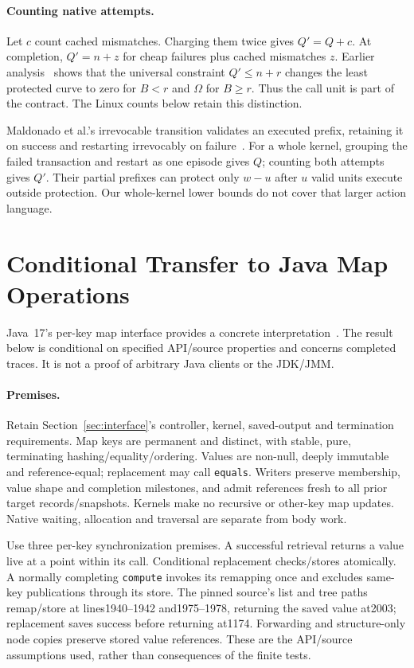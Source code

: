 \documentclass[acmsmall,screen,review,anonymous]{acmart}
\begin{document}
\paragraph{Counting native attempts.}
\label{sec:recount}
Let $c$ count cached mismatches. Charging them twice gives $Q'=Q+c$. At completion, $Q'=n+z$ for cheap failures plus cached mismatches $z$. Earlier analysis~\cite{chargedartifact} shows that the universal constraint $Q'\le n+r$ changes the least protected curve to zero for $B<r$ and $\Omega$ for $B\ge r$. Thus the call unit is part of the contract. The Linux counts below retain this distinction.

Maldonado et al.'s irrevocable transition validates an executed prefix, retaining it on success and restarting irrevocably on failure~\cite[Section~III.D]{maldonado2011}. For a whole kernel, grouping the failed transaction and restart as one episode gives $Q$; counting both attempts gives $Q'$. Their partial prefixes can protect only $w-u$ after $u$ valid units execute outside protection. Our whole-kernel lower bounds do not cover that larger action language.

\section{Conditional Transfer to Java Map Operations}
\label{sec:java}

Java~17's per-key map interface provides a concrete interpretation~\cite{cmap17,chm17,chmsource17}. The result below is conditional on specified API/source properties and concerns completed traces. It is not a proof of arbitrary Java clients or the JDK/JMM.

\paragraph{Premises.}
Retain Section~\ref{sec:interface}'s controller, kernel, saved-output and termination requirements. Map keys are permanent and distinct, with stable, pure, terminating hashing/equality/ordering. Values are non-null, deeply immutable and reference-equal; replacement may call \texttt{equals}. Writers preserve membership, value shape and completion milestones, and admit references fresh to all prior target records/snapshots. Kernels make no recursive or other-key map updates. Native waiting, allocation and traversal are separate from body work.

Use three per-key synchronization premises. A successful retrieval returns a value live at a point within its call. Conditional replacement checks/stores atomically. A normally completing \texttt{compute} invokes its remapping once and excludes same-key publications through its store. The pinned source's list and tree paths remap/store at lines1940--1942 and1975--1978, returning the saved value at2003; replacement saves success before returning at1174. Forwarding and structure-only node copies preserve stored value references. These are the API/source assumptions used, rather than consequences of the finite tests.
\end{document}
